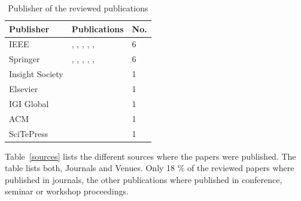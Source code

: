 \documentclass[runningheads]{llncs}
\begin{document}
\begin{table}
    \centering
    \caption{Publisher of the reviewed publications}
    \begin{tabular}{ | l | l | l | }
        \hline
        \textbf{Publisher} & \textbf{Publications}                                                                                                                             & \textbf{No.} \\
        \hline
        \hline
        IEEE               & \cite{Silalahi20221}, \cite{MacAk2020}, \cite{Zaman20192982}, \cite{Mishra2018613}, \cite{Talamo2013}, \cite{Mardani2013}                         & 6            \\
        \hline
        Springer           & \cite{Breitmayer202411}, \cite{MozafariMehr2022397}, \cite{MozafariMehr202182}, \cite{Sarno2020}, \cite{Zahoransky2014360}, \cite{Leitner2013719} & 6            \\
        \hline
        Insight Society    & \cite{Yunizal20221387}                                                                                                                            & 1            \\
        \hline
        Elsevier           & \cite{Fazzinga2020}                                                                                                                               & 1            \\
        \hline
        IGI Global         & \cite{Zhu201783}                                                                                                                                  & 1            \\
        \hline
        ACM                & \cite{Accorsi20131462}                                                                                                                            & 1            \\
        \hline
        SciTePress         & \cite{Dedousis202235}                                                                                                                             & 1            \\
        \hline
    \end{tabular}
    \label{Publisher}
\end{table}
Table~\ref{sources} lists the different sources where the papers were published. The table lists both, Journals and Venues. Only 18 \% of the reviewed papers where published in journals, the
other publications where published in conference, seminar or workshop proceedings.
\end{document}
